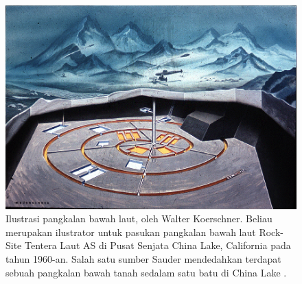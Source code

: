 \documentclass[10pt,twocolumn,letterpaper]{article}
\begin{document}
\begin{figure}[t]
\begin{center}
   \includegraphics[width=1\linewidth]{undersea.jpg}
\end{center}
   \caption{Ilustrasi pangkalan bawah laut, oleh Walter Koerschner. Beliau merupakan ilustrator untuk pasukan pangkalan bawah laut Rock-Site Tentera Laut AS di Pusat Senjata China Lake, California pada tahun 1960-an. Salah satu sumber Sauder mendedahkan terdapat sebuah pangkalan bawah tanah sedalam satu batu di China Lake \cite{22,23}.}
\label{fig:5}
\label{fig:onecol}
\end{figure}
\end{document}
